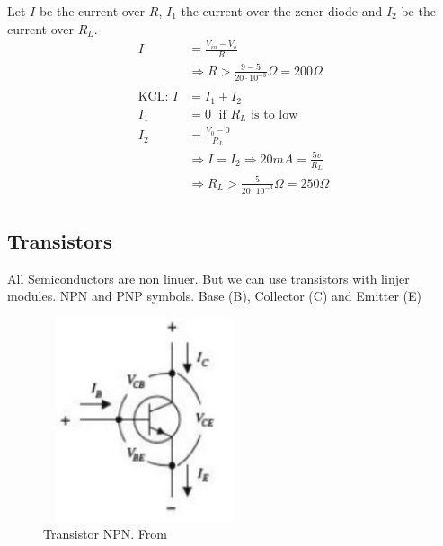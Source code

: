 Let $I$ be the current over $R$, $I_1$ the current over the zener diode
and $I_2$ be the current over $R_L$.
\begin{align*}
    I &= \frac{V_{in}-V_o}{R} \\
    &\Rightarrow R > \frac{9-5}{20\cdot10^{-3}}\Omega = 200\Omega \\ 
    \\
    \text{KCL: }  I &= I_1 + I_2 \\
    I_1 &= 0 \; \text{ if $R_L$ is to low} \\
    I_2 &= \frac{V_0-0}{R_L} \\
    &\Rightarrow I = I_2 \Rightarrow 20mA = \frac{5v}{R_L} \\
    &\Rightarrow R_L > \frac{5}{20\cdot10^{-3}}\Omega = 250\Omega \\
\end{align*}


\newpage
\subsection{Transistors}
All Semiconductors are non linuer. But we can use transistors with linjer modules. \newline
NPN and PNP symbols. Base (B), Collector (C) and Emitter (E)
\begin{figure}[h]
    \vspace{10mm}
    \centering
    \includegraphics[width=6cm, height=6cm]{image/transistor-NPN.png}
    \caption{Transistor NPN. From \cite{}}
\end{figure}

